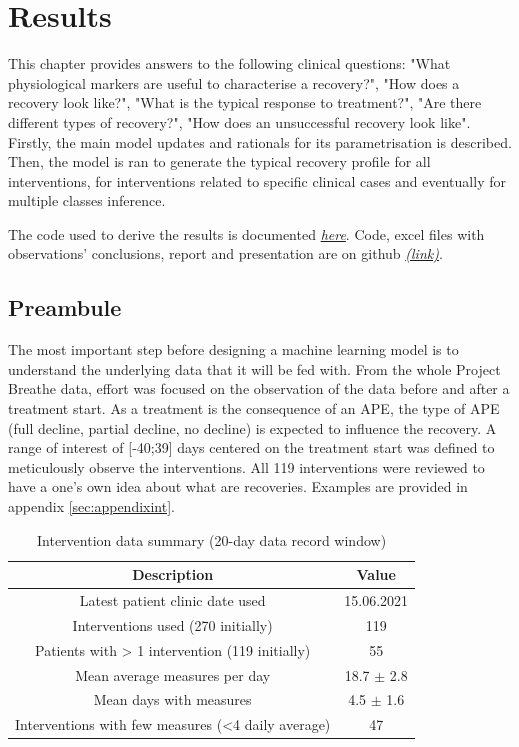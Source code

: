 \chapter{Results}
This chapter provides answers to the following clinical questions: "What physiological markers are useful to characterise a recovery?", "How does a recovery look like?", "What is the typical response to treatment?", "Are there different types of recovery?", "How does an unsuccessful recovery look like". Firstly, the main model updates and rationals for its parametrisation is described. Then, the model is ran to generate the typical recovery profile for all interventions, for interventions related to specific clinical cases and eventually for multiple classes inference. 

The code used to derive the results is documented \href{https://tristantreb.github.io/pdm/}{\textit{here}}. Code, excel files with observations' conclusions, report and presentation are on github \href{https://github.com/tristantreb/pdm}{\textit{(link)}}.

\section{Preambule}
The most important step before designing a machine learning model is to understand the underlying data that it will be fed with. From the whole Project Breathe data, effort was focused on the observation of the data before and after a treatment start. As a treatment is the consequence of an APE, the type of APE (full decline, partial decline, no decline) is expected to influence the recovery. A range of interest of [-40;39] days centered on the treatment start was defined to meticulously observe the interventions. All 119 interventions were reviewed to have a one's own idea about what are recoveries. Examples are provided in appendix \ref{sec:appendixint}.

    \begin{table}[H]
        \centering
        \begin{tabular}{c|c}
         \hline
        \textbf{Description} & \textbf{Value}  \\
        \hline
        Latest patient clinic date used & 15.06.2021 \\
        Interventions used (270 initially) & 119 \\
        Patients with > 1 intervention (119 initially) & 55 \\
        Mean average measures per day & 18.7 $\pm$ 2.8 \\
        Mean days with measures & 4.5 $\pm$ 1.6 \\
        Interventions with few measures (<4 daily average) & 47 \\
        \hline
        \end{tabular}
        \caption{Intervention data summary (20-day data record window)}
        \label{tab:intrdata}
    \end{table}

